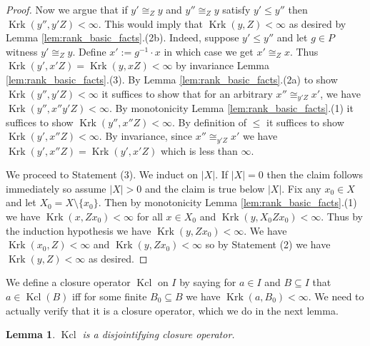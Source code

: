 \documentclass[12pt]{amsart}
\theoremstyle{plain}
\newtheorem{lemma}[theorem]{Lemma}
\theoremstyle{definition}
\newcommand{\isom}{\cong}
\DeclareMathOperator{\clmin}{Kcl}
\DeclareMathOperator{\Krk}{Krk}
\begin{document}
\begin{proof}
Now we argue that if $y' \isom_Z y$ and $y'' \isom_Z y$ satisfy $y' \le y''$ then $\Krk(y'', y'Z) < \infty$.
This would imply that $\Krk(y, Z) < \infty$ as desired by Lemma \ref{lem:rank_basic_facts}.(2b).
Indeed, suppose $y' \le y''$ and let $g \in P$ witness $y' \isom_Z y$.
Define $x' := g^{-1} \cdot x$ in which case we get $x' \isom_Z x$.
Thus $\Krk(y', x'Z) = \Krk(y, xZ) < \infty$ by invariance Lemma \ref{lem:rank_basic_facts}.(3).
By Lemma \ref{lem:rank_basic_facts}.(2a) to show $\Krk(y'', y'Z) < \infty$ it suffices to show that for an arbitrary $x'' \isom_{y'Z} x'$, we have $\Krk(y'', x''y'Z) < \infty$.
By monotonicity Lemma \ref{lem:rank_basic_facts}.(1) it suffices to show $\Krk(y'', x''Z) < \infty$.
By definition of $\le$ it suffices to show $\Krk(y', x''Z) < \infty$.
By invariance, since $x'' \isom_{y'Z} x'$ we have $\Krk(y', x''Z) = \Krk(y', x'Z)$ which is less than $\infty$.

We proceed to Statement (3).
We induct on $|X|$.
If $|X| = 0$ then the claim follows immediately so assume $|X| > 0$ and the claim is true below $|X|$.
Fix any $x_0 \in X$ and let $X_0 = X \setminus \{x_0\}$.
Then by monotonicity Lemma \ref{lem:rank_basic_facts}.(1) we have $\Krk(x, Zx_0) < \infty$ for all $x \in X_0$ and $\Krk(y, X_0 Z x_0) < \infty$.
Thus by the induction hypothesis we have $\Krk(y, Z x_0) < \infty$.
We have $\Krk(x_0, Z) < \infty$ and $\Krk(y, Zx_0) < \infty$ so by Statement (2) we have $\Krk(y, Z) < \infty$ as desired.
\end{proof}

We define a closure operator $\clmin$ on $I$ by saying for $a \in I$ and $B \subseteq I$ that $a \in \clmin(B)$ iff for some finite $B_0 \subseteq B$ we have $\Krk(a, B_0) < \infty$.
We need to actually verify that it is a closure operator, which we do in the next lemma.

\begin{lemma}\label{lem:clmin_closure2}
$\clmin$ is a disjointifying closure operator.
\end{lemma}
\end{document}
